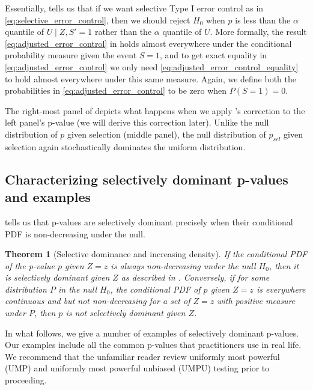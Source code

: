 \documentclass{article}
\newtheorem{theorem}{Theorem}
\begin{document}
Essentially,  tells us that if we want selective Type I error control as in \eqref{eq:selective_error_control}, then we should reject $H_0$ when $p$ is less than the $\alpha$ quantile of $U \mid Z, S' = 1$ rather than the $\alpha$ quantile of $U$. More formally, the result \eqref{eq:adjusted_error_control} in  holds almost everywhere under the conditional probability measure given the event $S=1$, and to get exact equality in \eqref{eq:adjusted_error_control} we only need \eqref{eq:adjusted_error_control_equality} to hold almost everywhere under this same measure. Again, we define both the probabilities in \eqref{eq:adjusted_error_control} to be zero when $P(S=1)=0$. 

The right-most panel of  depicts what happens when we apply 's correction to the left panel's p-value (we will derive this correction later). Unlike the null distribution of $p$ given selection (middle panel), the null distribution of $p_{sel}$ given selection again stochastically dominates the uniform distribution. 

\subsection{Characterizing selectively dominant p-values and examples}

 tells us that p-values are selectively dominant precisely when their conditional PDF is non-decreasing under the null. 

\begin{theorem}[Selective dominance and increasing density]
    \label{thm:density}
    If the conditional PDF of the p-value $p$ given $Z=z$ is always non-decreasing under the null $H_0$, then it is selectively dominant given $Z$ as described in . Conversely, if for some distribution $P$ in the null $H_0$, the conditional PDF of $p$ given $Z=z$ is everywhere continuous and but not non-decreasing for a set of $Z=z$ with positive measure under $P$, then $p$ is not selectively dominant given $Z$.  
\end{theorem}

In what follows, we give a number of examples of selectively dominant p-values. Our examples include all the common p-values that practitioners use in real life. We recommend that the unfamiliar reader review uniformly most powerful (UMP) and uniformly most powerful unbiased (UMPU) testing \cite[Chapter 3 and Chapter 4]{Lehmann} prior to proceeding.
\end{document}
